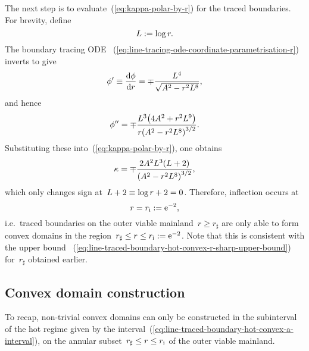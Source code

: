 The next step is to evaluate~(\ref{eq:kappa-polar-by-r})
for the traced boundaries.
For brevity, define
\begin{equation}
  L \defeq \log r.
  \label{eq:line-abbreviation-l}
\end{equation}
The boundary tracing ODE~%
  (\ref{eq:line-tracing-ode-coordinate-parametrisation-r})
inverts to give
\begin{equation}
  \phi' \ideq \tder{\phi}{r} = \mp \frac{L^4}{\sqrt{A^2 - r^2 L^8}},
  \label{eq:line-traced-boundary-phi-r-derivative}
\end{equation}
and hence
\begin{equation}
  \phi'' =
  \mp \frac{L^3 \roundbr*{4 A^2 + r^2 L^9}}{r \roundbr*{A^2 - r^2 L^8}^{3/2}}.
  \label{eq:line-traced-boundary-phi-r-second-derivative}
\end{equation}
Substituting these into~(\ref{eq:kappa-polar-by-r}),
one obtains
\begin{equation}
  \kappa =
  \mp \frac{2 A^2 L^3 (L + 2)}{\roundbr*{A^2 - r^2 L^8}^{3/2}},
  \label{eq:line-traced-boundary-kappa-polar-by-r}
\end{equation}
which only changes sign at~$L + 2 \equiv \log r + 2 = 0$.
Therefore, inflection occurs at
\begin{equation}
  r = r_\infl \defeq \ee^{-2},
  \label{eq:line-r-inflection}
\end{equation}
i.e.~traced boundaries on the outer viable mainland~$r \ge r_\sharp$
are only able to form convex domains
in the region~$r_\sharp \le r \le r_{\mathrm{i}} := \mathrm{e}^{-2}$.
Note that this is consistent with the upper bound~%
  (\ref{eq:line-traced-boundary-hot-convex-r-sharp-upper-bound})
for~$r_\sharp$ obtained earlier.

\subsection{Convex domain construction}
\label{sec:line.convex.construction}

To recap, non-trivial convex domains can only be constructed
in the subinterval of the hot regime
given by the interval~(\ref{eq:line-traced-boundary-hot-convex-a-interval}),
on the annular subset~$r_\sharp \le r \le r_{\mathrm{i}}$
of the outer viable mainland.

\begin{figure}
\end{figure}

